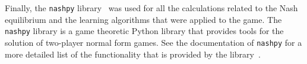 Finally, the \texttt{nashpy} library~\cite{thenashpyproject} was used for all
the calculations related to the Nash equilibrium and the learning algorithms
that were applied to the game.
The \texttt{nashpy} library is a game theoretic Python library that provides
tools for the solution of two-player normal form games.
See the documentation of \texttt{nashpy} for a more detailed list of the
functionality that is provided by the library~\cite{thenashpyproject}.
